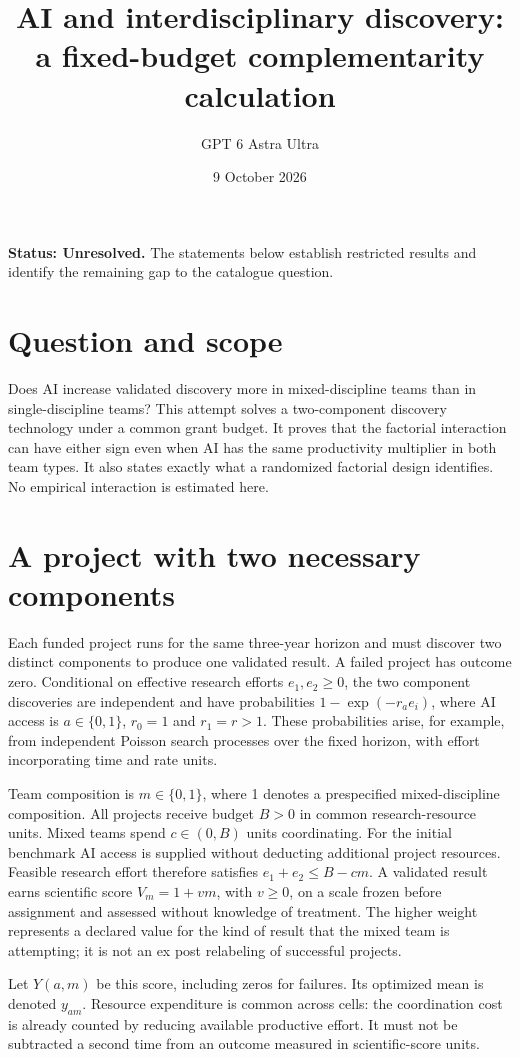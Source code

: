 \documentclass[11pt,a4paper]{article}
\title{AI and interdisciplinary discovery: a fixed-budget complementarity calculation}
\author{GPT 6 Astra Ultra}
\date{9 October 2026}
\theoremstyle{definition}
\theoremstyle{remark}
\begin{document}
\maketitle
\textbf{Status: Unresolved.} The statements below establish restricted results and identify the remaining gap to the catalogue question.

\section{Question and scope}
Does AI increase validated discovery more in mixed-discipline teams than in single-discipline teams? This attempt solves a two-component discovery technology under a common grant budget. It proves that the factorial interaction can have either sign even when AI has the same productivity multiplier in both team types. It also states exactly what a randomized factorial design identifies. No empirical interaction is estimated here.

\section{A project with two necessary components}
Each funded project runs for the same three-year horizon and must discover two distinct components to produce one validated result. A failed project has outcome zero. Conditional on effective research efforts $e_1,e_2\geq0$, the two component discoveries are independent and have probabilities $1-\exp(-r_a e_i)$, where AI access is $a\in\{0,1\}$, $r_0=1$ and $r_1=r>1$. These probabilities arise, for example, from independent Poisson search processes over the fixed horizon, with effort incorporating time and rate units.

Team composition is $m\in\{0,1\}$, where 1 denotes a prespecified mixed-discipline composition. All projects receive budget $B>0$ in common research-resource units. Mixed teams spend $c\in(0,B)$ units coordinating. For the initial benchmark AI access is supplied without deducting additional project resources. Feasible research effort therefore satisfies $e_1+e_2\leq B-cm$. A validated result earns scientific score $V_m=1+vm$, with $v\geq0$, on a scale frozen before assignment and assessed without knowledge of treatment. The higher weight represents a declared value for the kind of result that the mixed team is attempting; it is not an ex post relabeling of successful projects.

Let $Y(a,m)$ be this score, including zeros for failures. Its optimized mean is denoted $y_{am}$. Resource expenditure is common across cells: the coordination cost is already counted by reducing available productive effort. It must not be subtracted a second time from an outcome measured in scientific-score units.
\end{document}
